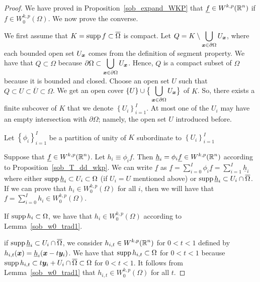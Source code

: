\begin{proof}
We have proved in Proposition~\ref{sob_expand_WKP} that
$\displaystyle \underline{f} \in W^{k,p}(\mathbb{R}^n)$ if
$\displaystyle f \in W^{k,p}_0(\Omega)$.  We now prove the converse.

 We first assume that
$\displaystyle K = \operatorname{supp} f \subset \overline{\Omega}$ is compact.
Let
$\displaystyle Q = K \setminus \bigcup_{{\bm{x}} \in \partial \Omega} U_{{\bm{x}}}$,
where each bounded open set $U_{{\bm{x}}}$ comes from the definition of
segment property.  We have that $Q \subset \Omega$ because
$\displaystyle \partial \Omega \subset \bigcup_{{\bm{x}}
\in \partial \Omega} U_{{\bm{x}}}$.
Hence, $Q$ is a compact subset of $\Omega$ because it is
bounded and closed.  Choose an open set $U$ such that
$Q \subset U \subset \overline{U} \subset \Omega$.
We get an open cover $\displaystyle \left\{U\right\} \cup
\big\{ \bigcup_{{\bm{x}} \in \partial \Omega} U_{{\bm{x}}} \big\}$ of $K$.
So, there exists a finite subcover of $K$ that we denote
$\displaystyle \left\{ U_i \right\}_{i=1}^I$.
At most one of the $U_i$ may have an empty intersection with $\partial \Omega$;
namely, the open set $U$ introduced before.

Let $\displaystyle \left\{ \phi_i \right\}_{i=1}^I$ be a partition
of unity of $K$ subordinate to $\displaystyle \left\{ U_i \right\}_{i=1}^I$

Suppose that $\displaystyle \underline{f} \in W^{k,p}(\mathbb{R}^n)$.
Let $h_i \equiv \phi_i f$. Then
$\displaystyle \underline{h}_i = \phi_i \underline{f} \in W^{k,p}(\mathbb{R}^n)$
according to Proposition~\ref{sob_T_dd_wkp}.
We can write $\underline{f}$ as
$\displaystyle \underline{f} = \sum_{i=0}^I \phi_i \underline{f}
= \sum_{i=1}^I \underline{h}_i$ where either
$\operatorname{supp} \underline{h}_i \subset U_i \subset \Omega$ (if $U_i = U$
mentioned above) or
$\operatorname{supp} \underline{h}_i \subset U_i \cap \overline{\Omega}$.
If we can prove that
$\displaystyle h_i \in W^{k,p}_0(\Omega)$ for all $i$, then we will
have that
$\displaystyle f = \sum_{i=0}^I h_i \in W^{k,p}_0(\Omega)$.

If $\operatorname{supp} h_i \subset \Omega$, we have that
$\displaystyle h_i \in W^{k,p}_0(\Omega)$ according to
Lemma~\ref{sob_w0_trad1}.

if $\operatorname{supp} \underline{h}_i \subset U_i \cap \overline{\Omega}$, we consider
$\displaystyle h_{i,t} \in W^{k,p}(\mathbb{R}^n)$ for $0 < t < 1$ defined by
$h_{i,t}({\bm{x}}) = \underline{h}_i({\bm{x}} - t {\bm{y}}_i)$.  We have that
$\operatorname{supp} h_{i,t} \subset \Omega$ for $0 < t < 1$ because
$\operatorname{supp} h_{i,t} \subset t{\bm{y}}_i + U_i \cap \overline{\Omega} \subset \Omega$
for $0< t <1$.  It follows from Lemma~\ref{sob_w0_trad1} that
$\displaystyle h_{i,t} \in W^{k,p}_0(\Omega)$ for all $t$.


\end{proof}
